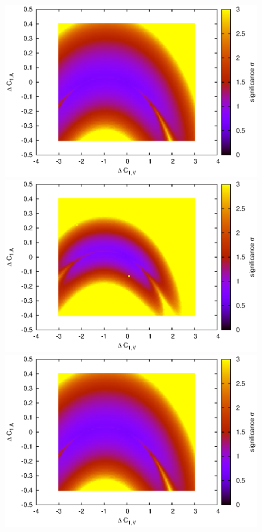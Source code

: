 \documentclass[preprint]{JHEP3} %
\begin{document}
\begin{figure}[t]
\includegraphics[scale=0.6]{BLLLO1223HSsig_SUA2_300_1.30.eps} 
\includegraphics[scale=0.6]{BLLNLO1223sig_SUA2_300_1.15.eps} 
\\
\includegraphics[scale=0.6]{BLLLO1223HSsig_SUA2_300_1.30.eps} 

\end{figure}
\end{document}
